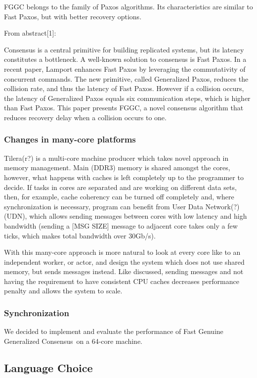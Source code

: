 \documentclass[english,11pt]{article}
\newcommand{\fggc}{Fast Genuine Generalized Consensus\ }
\begin{document}
FGGC belongs to the family of Paxos algorithms. Its characteristics are similar
to Fast Paxos, but with better recovery options.

From abstract[1]:

Consensus is a central primitive for building replicated systems, but its
latency constitutes a bottleneck. A well-known solution to consensus is Fast
Paxos. In a recent paper, Lamport enhances Fast Paxos by leveraging the
commutativity of concurrent commands. The new primitive, called Generalized
Paxos, reduces the collision rate, and thus the latency of Fast Paxos. However
if a collision occurs, the latency of Generalized Paxos equals six
communication steps, which is higher than Fast Paxos. This paper presents FGGC,
a novel consensus algorithm that reduces recovery delay when a collision occurs
to one.

\subsubsection{Changes in many-core platforms}


Tilera(r?) is a multi-core machine producer which takes novel approach in
memory management. Main (DDR3) memory is shared amongst the cores, however,
what happens with caches is left completely up to the programmer to decide.  If
tasks in cores are separated and are working on different data sets, then, for
example, cache coherency can be turned off completely and, where
synchronization is necessary, program can benefit from User Data Network(?)
(UDN), which allows sending messages between cores with low latency and high
bandwidth (sending a [MSG SIZE] message to adjacent core takes only a few ticks,
which makes total bandwidth over 30Gb/s).

With this many-core approach is more natural to look at every core like to an
independent worker, or actor, and design the system which does not use shared
memory, but sends messages instead. Like discussed, sending messages and not
having the requirement to have consistent CPU caches decreases performance
penalty and allows the system to scale.

\subsubsection{Synchronization}

We decided to implement and evaluate the performance of \fggc on a 64-core
machine.

\subsection{Language Choice}
\end{document}
